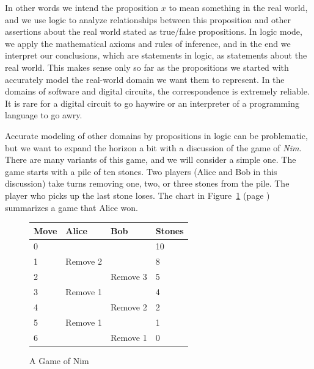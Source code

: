 {{In other words we intend the proposition $x$
to mean something in the real world,
and we use logic to analyze relationships between this proposition and other
assertions about the real world stated as true/false propositions.
In logic mode, we apply the mathematical axioms and rules of inference,
and in the end we interpret our conclusions, which are statements in logic,
as statements about the real world.
This makes sense only so far as the propositions we started with
accurately model the real-world domain we want them to represent.
In the domains of software and digital circuits,
the correspondence is extremely reliable.
It is rare for a digital circuit to go haywire or an interpreter of
a programming language to go awry.

Accurate modeling of other domains by propositions in logic can be problematic,
but we want to expand the horizon a bit with a discussion
of the game of \emph{Nim}.
There are many variants of this game, and we will consider a simple one.
The game starts with a pile of ten stones. Two players (Alice and Bob in this discussion)
take turns removing one, two, or three stones from the pile.
The player who picks up the last stone loses.
The chart in
Figure~\ref{fig:example-nim-game} (page \pageref{fig:example-nim-game})
summarizes a game that Alice won.

\begin{figure}
\begin{center}
\begin{tabular}{l|l|l|l}
Move & Alice     & Bob      & Stones \\
\hline
0    &           &          & 10     \\
1    & Remove 2  &          & 8      \\
2    &           & Remove 3 & 5      \\
3    & Remove 1  &          & 4      \\
4    &           & Remove 2 & 2      \\
5    & Remove 1  &          & 1      \\
6    &           & Remove 1 & 0      \\
\end{tabular}
\end{center}
\caption{A Game of Nim}
\label{fig:example-nim-game}
\end{figure}

}}
